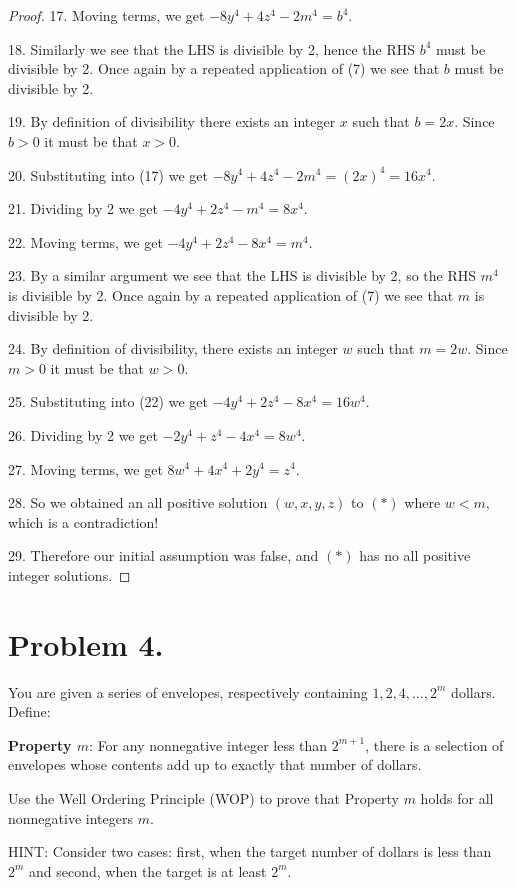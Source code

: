 \documentclass[14pt]{extarticle}
\begin{document}
\begin{proof}
17. Moving terms, we get $-8y^4 + 4z^4 - 2m^4 = b^4$.

18. Similarly we see that the LHS is divisible by 2, hence the RHS $b^4$ must be divisible by 2. Once again by a repeated application of (7) we see that $b$ must be divisible by 2.

19. By definition of divisibility there exists an integer $x$ such that $b = 2x$. Since $b > 0$ it must be that $x > 0$.

20. Substituting into (17) we get $-8y^4 + 4z^4 - 2m^4 = (2x)^4 = 16x^4$.

21. Dividing by 2 we get $-4y^4 + 2z^4 - m^4 = 8x^4$.

22. Moving terms, we get $-4y^4 + 2z^4 - 8x^4 = m^4$.

23. By a similar argument we see that the LHS is divisible by 2, so the RHS $m^4$ is divisible by 2. Once again by a repeated application of (7) we see that $m$ is divisible by 2.

24. By definition of divisibility, there exists an integer $w$ such that $m = 2w$. Since $m > 0$ it must be that $w > 0$. 

25. Substituting into (22) we get $-4y^4 + 2z^4 - 8x^4 = 16w^4$.

26. Dividing by 2 we get $-2y^4 + z^4 - 4x^4 = 8w^4$.

27. Moving terms, we get $8w^4 + 4x^4 + 2y^4 = z^4$.

28. So we obtained an all positive solution $(w, x, y, z)$ to $(*)$ where $w < m$, which is a contradiction!

29. Therefore our initial assumption was false, and $(*)$ has no all positive integer solutions.
\end{proof}

\section{Problem 4.}

You are given a series of envelopes, respectively containing $1, 2, 4, \ldots, 2^m$ dollars. Define:

\textbf{Property $m$}: For any nonnegative integer less than $2^{m+1}$, there is a selection of envelopes whose contents add up to exactly that number of dollars.

Use the Well Ordering Principle (WOP) to prove that Property $m$ holds for all nonnegative integers $m$.

HINT: Consider two cases: first, when the target number of dollars is less than $2^m$ and second, when the target is at least $2^m$.
\end{document}
